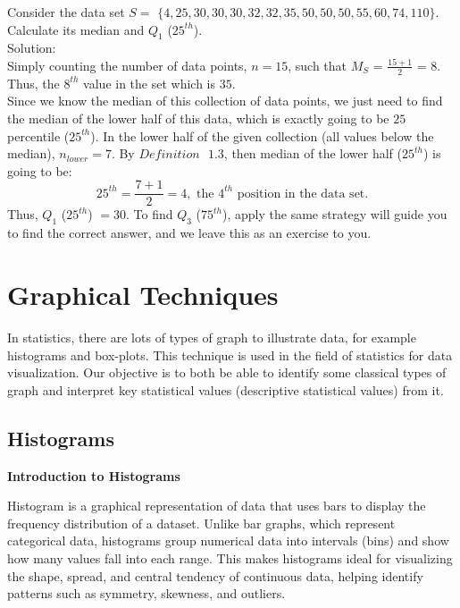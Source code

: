 \begin{example}
Consider the data set $S = $ $\{4, 25, 30, 30, 30, 32, 32, 35, 50, 50, 50, 55, 60, 74, 110\}$. Calculate its median and $Q_1$ ($25^{th}$).\\
Solution:\\
Simply counting the number of data points, $n = 15$, such that $M_{S}$ = $\frac{15 + 1}{2}$ = $8$. Thus, the $8^{th}$ value in the set which is $35$.\\
Since we know the median of this collection of data points, we just need to find the median of the lower half of this data, which is exactly going to be $25$ percentile ($25^{th}$). In the lower half of the given collection (all values below the median), $n_{lower} = 7$. By $Definition \text{ } 1.3$, then median of the lower half ($25^{th}$) is going to be: \[ 25^{th} = \frac{7+1}{2} = 4, \text{ the $4^{th}$ position in the data set}.\] Thus, $Q_1$ ($25^{th}$) $= 30$. To find $Q_3$ ($75^{th}$), apply the same strategy will guide you to find the correct answer, and we leave this as an exercise to you.
\end{example}

\section{Graphical Techniques}

In statistics, there are lots of types of graph to illustrate data, for example histograms and box-plots. This technique is used in the field of statistics for data visualization. Our objective is to both be able to identify some classical types of graph and interpret key statistical values (descriptive statistical values) from it.

\subsection{Histograms}

\textbf{Introduction to Histograms}

Histogram is a graphical representation of data that uses bars to display the frequency distribution of a dataset. Unlike bar graphs, which represent categorical data, histograms group numerical data into intervals (bins) and show how many values fall into each range. This makes histograms ideal for visualizing the shape, spread, and central tendency of continuous data, helping identify patterns such as symmetry, skewness, and outliers.

